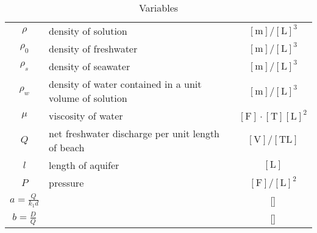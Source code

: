 \begin{table}[H]
\begin{tabular}{cp{200pt}c}
    $\rho$& density of solution& $[\text{m}]/[\text{L}]^3$\\
    $\rho _{0} $& density of freshwater& $[\text{m}]/[\text{L}]^3$\\
    $\rho _{s} $& density of seawater& $[\text{m}]/[\text{L}]^3$\\
    $\rho _{w} $& density of water contained in a unit volume of solution& $[\text{m}]/[\text{L}]^3$\\
    $\mu $& viscosity of water& $[\text{F}] \cdot [\text{T}][\text{L}]^2$\\
    $Q$& net freshwater discharge per unit length of beach& $[\text{V}]/[\text{TL}]$\\
    $l$& length of aquifer& $[\text{L}]$\\
    $P$& pressure& $[\text{F}]/[\text{L}]^2$\\
    $a=\frac{Q}{k_1 d}$& & [\hspace{0.5em}]\\
    $b=\frac{D}{Q}$& & [\hspace{0.5em}]
  \end{tabular}
  \caption{Variables}
  \label{tab:Variable}
\end{table}
\newpage

